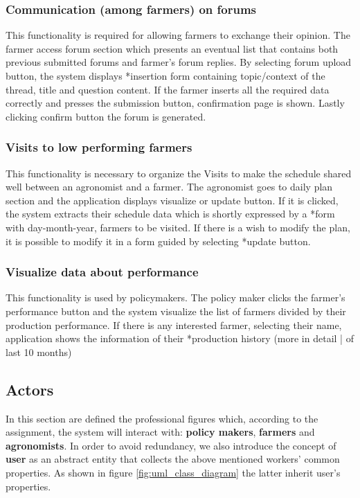 \subsubsection{Communication (among farmers) on forums}
This functionality is required for allowing farmers to exchange their opinion. The farmer 
access forum section which presents an eventual list that contains both previous submitted 
forums and farmer’s forum replies. By selecting forum upload button, the system displays 
*insertion form containing topic/context of the thread, title and question content. If the farmer 
inserts all the required data correctly and presses the submission button, confirmation page 
is shown. Lastly clicking confirm button the forum is generated.   
\subsubsection{Visits to low performing farmers}
This functionality is necessary to organize the Visits to make the schedule shared well 
between an agronomist and a farmer. The agronomist goes to daily plan section and the 
application displays visualize or update button. If it is clicked, the system extracts their schedule
data which is shortly expressed by a *form with day-month-year, farmers to be visited.
If there is a wish to modify the plan, it is possible to modify it in a form guided by selecting 
*update button.
\subsubsection{Visualize data about performance}
This functionality is used by policymakers. The policy maker clicks the farmer's performance 
button and the system visualize the list of farmers divided by their production performance. If 
there is any interested farmer, selecting their name, application shows the information of their
*production history (more in detail | of last 10 months) 

\subsection{Actors}
In this section are defined the professional figures which, according to the assignment, the system will interact with: \textbf{policy makers}, \textbf{farmers} and \textbf{agronomists}. In order to avoid redundancy, we also introduce the concept of \textbf{user} as an abstract entity that collects the above mentioned workers' common properties. As shown in figure \ref{fig:uml_class_diagram} the latter inherit user's properties.
